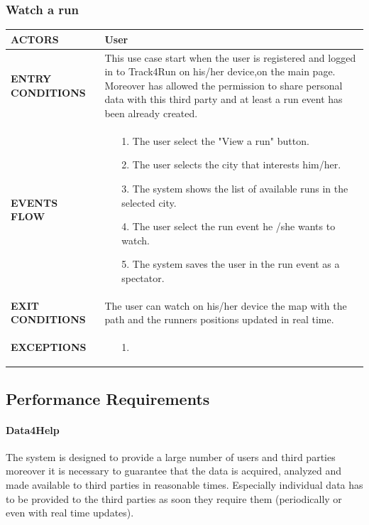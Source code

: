 \documentclass[a4paper]{article}
\begin{document}
\subsubsection{Watch a run}
\begin{center}
    \begin{tabular}{l || p{8cm} ||}
        \bf{ACTORS} & User \\ \hline
        \bf{ENTRY CONDITIONS} & This use case start when the user is registered and logged in to Track4Run on his/her device,on the main page. Moreover has allowed the permission to share personal data with this third party and at least a run event has been already created. \\ \hline
        \bf{EVENTS FLOW} & \begin{itemize}[noitemsep, topsep=0cm, leftmargin=*] \vspace{-0.2cm}
            \item[1.] The user select the "View a run" button.
            \item[2.] The user selects the city that interests him/her. 
            \item[3.] The system shows the list of available runs in the selected city.
            \item[4.] The user select the run event he /she wants to watch.
            \item[5.] The system saves the user in the run event as a spectator.
        \end{itemize}
        \\ \hline
        \bf{EXIT CONDITIONS} & The user can watch on his/her device the map with the path and the runners positions updated in real time. \\ \hline
        \bf{EXCEPTIONS} & \begin{itemize}[noitemsep, topsep=0cm, leftmargin=*] \vspace{-0.2cm}
            \item[1.] 
        \end{itemize}
        \\ \hline \hline
    \end{tabular}
\end{center}
    
    \subsection{Performance Requirements}
    
    \paragraph{Data4Help} The system is designed to provide a large number of users and third parties moreover it is necessary to guarantee that the data is acquired, analyzed and made available to third parties in reasonable times. Especially individual data has to be provided to the third parties as soon they require them (periodically or even with real time updates).
    
\end{document}
